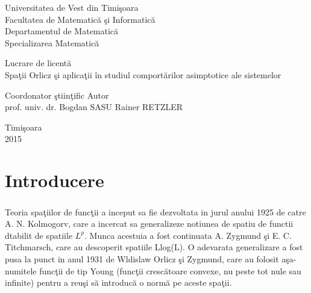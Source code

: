 \documentclass[12pt]{report}
\begin{document}
\begin{titlepage}
\setlength{\topsep}{0pt}
\vspace{-5cm}
\begin{center}

Universitatea de Vest din Timi\c soara\\
Facultatea  de  Matematic\u a  \c si  Informatic\u a\\Departamentul de Matematic\u a\\ Specializarea Matematic\u a
\end{center}

\vspace{6cm}
\begin{center}
\begin{huge}
Lucrare de licent\u a\\
Spa\c tii Orlicz \c si aplica\c tii \^ in studiul comport\u arilor asimptotice ale sistemelor
\end{huge}
\end{center}
\vspace{2cm}
\begin{flushleft}
Coordonator \c stiin\c tific \hfill Autor\\
prof. univ. dr. Bogdan SASU \hfill Rainer RETZLER



\end{flushleft}

\vspace{3cm}
\begin{center}
Timi\c soara\\
2015
\end{center}
\end{titlepage}

\tableofcontents
\chapter{Introducere}
\paragraph{}
Teoria spa\c tiilor de func\c tii a inceput sa fie dezvoltata in jurul anului 1925 de catre A. N. Kolmogorv, care a incercat sa generalizeze notiunea de spatiu de functii dtabilit de spatiile ${L^p}$.
Munca acestuia a fost continuata A. Zygmund \c si E. C. Titchmarsch, care au descoperit spatiile Llog(L). O adevarata generalizare a fost pusa la punct in anul 1931 de Wldislaw Orlicz \c si Zygmund, care au folosit a\c sa-numitele func\c tii de tip Young (func\c tii cresc\u atoare convexe, nu peste tot nule sau infinite) pentru a reu\c si s\u a introduc\u a o norm\u a pe aceste spa\c tii.
\end{document}
